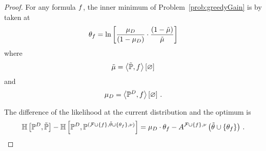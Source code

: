 \begin{proof}
	For any formula $f$, the inner minimum of Problem~\eqref{prob:greedyGain} is by  taken at
		\[ \theta_{f} = \ln \left[ \frac{\mu_{D}}{(1-\mu_{D})}\cdot \frac{(1-\tilde{\mu})}{\tilde{\mu}} \right]  \]
	where
		\[ \tilde{\mu} = \left\langle \tilde{\mathbb{P}},f\right\rangle \left[ \varnothing \right] \]
	and
		\[ \mu_{D} = \left\langle \mathbb{P}^{D},f\right\rangle \left[ \varnothing \right] \, . \]

	The difference of the likelihood at the current distribution and the optimum is
	\begin{align*}
		\mathbb{H}\left[\mathbb{P}^{D},\tilde{\mathbb{P}}\right]
		- \mathbb{H}\left[\mathbb{P}^{D},\mathbb{P}^{(\mathcal{F}\cup\{f\},\tilde{\theta}\cup\{\theta_{f}\},\nu)}\right]
		= \mu_{D} \cdot \theta_{f} - A^{\mathcal{F}\cup\{f\},\nu}\left(\tilde{\theta}\cup\{\theta_{f}\}\right) \, .
	\end{align*}


\end{proof}
